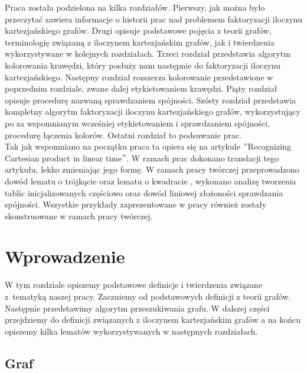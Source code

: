 \documentclass[12pt,a4paper,titlepage]{article}
\begin{document}
Praca została podzielona na kilka rozdziałów. Pierwszy, jak można było przeczytać zawiera informacje o historii prac nad problemem faktoryzacji iloczynu kartezjańskiego grafów. Drugi opisuje podstawowe pojęcia z teorii grafów, terminologię związaną z iloczynem kartezjańskim grafów, jak i twierdzenia wykorzystywane w kolejnych rozdziałach. Trzeci rozdział przedstawia algorytm kolorowania krawędzi, który posłuży nam następnie do faktoryzacji iloczynu kartezjańskiego. Następny rozdział rozszerza kolorowanie przedstawione w poprzednim rozdziale, zwane dalej etykietowaniem krawędzi. Piąty rozdział opisuje procedurę nazwaną sprawdzaniem spójności. Szósty rozdział przedstawia kompletny algorytm faktoryzacji iloczynu kartezjańskiego grafów, wykorzystujący po za wspomnianym wcześniej etykietowaniem i sprawdzaniem spójności, procedurę łączenia kolorów. Ostatni rozdział to podsuwanie prac. \\

Tak jak wspomniano na początku praca ta opiera się na artykule $"$Recognizing Cartesian product in linear time$"$. W ramach prac dokonano translacji tego artykułu, lekko zmieniając jego formę. W ramach pracy twórczej przeprowadzono dowód lematu o trójkącie oraz lematu o kwadracie , wykonano analizę tworzenia tablic inicjalizowanych częściowo oraz dowód liniowej złożoności sprawdzania spójności. Wszystkie przykłady zaprezentowane w pracy również zostały skonstruowane w ramach pracy twórczej.
\newpage

\section{Wprowadzenie}
W tym rozdziale opiszemy podstawowe definicje i twierdzenia związane z~tematyką naszej pracy. Zaczniemy od podstawowych definicji z teorii grafów. Następnie przedstawimy algorytm przeszukiwania grafu. W dalszej części przejdziemy do definicji związanych z iloczynem kartezjańskim grafów a na końcu opiszemy kilka lematów wykorzystywanych w następnych rozdziałach.
\subsection{Graf}
\end{document}
